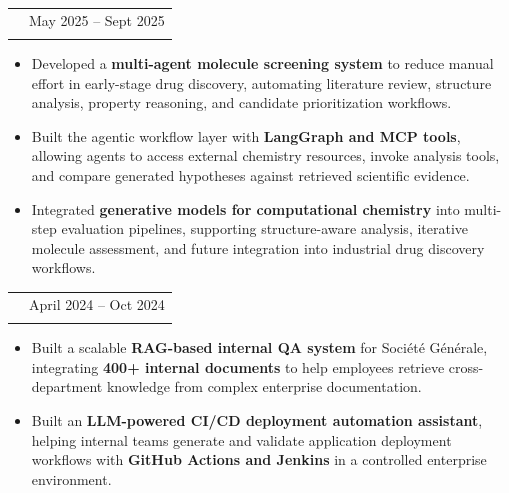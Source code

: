 \documentclass[a4paper,10pt]{article}
\makeatletter
\newcommand{\DetailFont}{\fontsize{9.5}{11.5}\selectfont}
\newlength{\EntryGap}
\newlength{\BulletGap}
\newlength{\HeadingToBullets}
\newenvironment{resumeBullets}{%
  \begin{itemize}[
    leftmargin=12pt,
    labelsep=5pt,
    label=\textbullet,
    itemsep=\BulletGap,
    parsep=0pt,
    topsep=\HeadingToBullets,
    partopsep=0pt
  ]
}{%
  \end{itemize}
}
\newcommand{\entry}[3]{%
  \Needspace{7\baselineskip}%
  \begin{tabularx}{\linewidth}{
    @{}
    >{\raggedright\arraybackslash}X
    @{\hspace{12pt}}
    r
    @{}
  }
    {\fontsize{11}{13}\selectfont\bfseries #1}
      & {\DetailFont #2}\\[2pt]
    \multicolumn{2}{@{}p{\linewidth}@{}}{
      {\fontsize{10}{12}\selectfont\itshape #3}
    }\\
  \end{tabularx}\par\nobreak
}
\makeatother
\begin{document}
\entry
  {Misogi Labs (Paris, France)}
  {May 2025 -- Sept 2025}
  {AI Engineer}

\begin{resumeBullets}
  \item Developed a \textbf{multi-agent molecule screening system} to reduce manual effort in early-stage drug discovery, automating literature review, structure analysis, property reasoning, and candidate prioritization workflows.

  \item Built the agentic workflow layer with \textbf{LangGraph and MCP tools}, allowing agents to access external chemistry resources, invoke analysis tools, and compare generated hypotheses against retrieved scientific evidence.

  \item Integrated \textbf{generative models for computational chemistry} into multi-step evaluation pipelines, supporting structure-aware analysis, iterative molecule assessment, and future integration into industrial drug discovery workflows.
\end{resumeBullets}

\vspace{\EntryGap}

\entry
  {Société Générale (Paris, France)}
  {April 2024 -- Oct 2024}
  {AI Consultant Intern}

\begin{resumeBullets}
  \item Built a scalable \textbf{RAG-based internal QA system} for Société Générale, integrating \textbf{400+ internal documents} to help employees retrieve cross-department knowledge from complex enterprise documentation.

  \item Built an \textbf{LLM-powered CI/CD deployment automation assistant}, helping internal teams generate and validate application deployment workflows with \textbf{GitHub Actions and Jenkins} in a controlled enterprise environment.
\end{resumeBullets}


%
%
%
\end{document}
